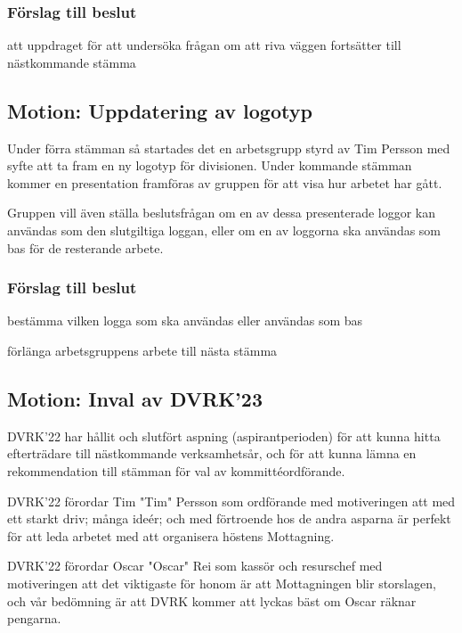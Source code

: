 \documentclass[protokoll]{dvd}
\begin{document}
\subsubsection*{Förslag till beslut}
\begin{attsatser}
    \item att uppdraget för att undersöka frågan om att riva väggen
    fortsätter till nästkommande stämma
\end{attsatser}

\subsection*{Motion: Uppdatering av logotyp}
Under förra stämman så startades det en arbetsgrupp styrd av Tim Persson
med syfte att ta fram en ny logotyp för divisionen. Under kommande stämman
kommer en presentation framföras av gruppen för att visa hur arbetet har gått.

Gruppen vill även ställa beslutsfrågan om en av dessa presenterade loggor
kan användas som den slutgiltiga loggan, eller om en av loggorna ska användas som
bas för de resterande arbete.

\subsubsection*{Förslag till beslut}
\begin{attsatser}
    \item bestämma vilken logga som ska användas eller användas som bas
    \item förlänga arbetsgruppens arbete till nästa stämma
\end{attsatser}

\subsection{Motion: Inval av DVRK'23}

DVRK'22 har hållit och slutfört aspning (aspirantperioden) för att kunna hitta efterträdare till nästkommande verksamhetsår, och för att kunna lämna en rekommendation till stämman för val av kommittéordförande.

DVRK'22 förordar Tim "Tim" Persson som ordförande med motiveringen att med ett starkt driv; många ideér; och med förtroende hos de andra asparna är perfekt för att leda arbetet med att organisera höstens Mottagning.

DVRK'22 förordar Oscar "Oscar" Rei som kassör och resurschef med motiveringen att det viktigaste för honom är att Mottagningen blir storslagen, och vår bedömning är att DVRK kommer att lyckas bäst om Oscar räknar pengarna.
\end{document}
